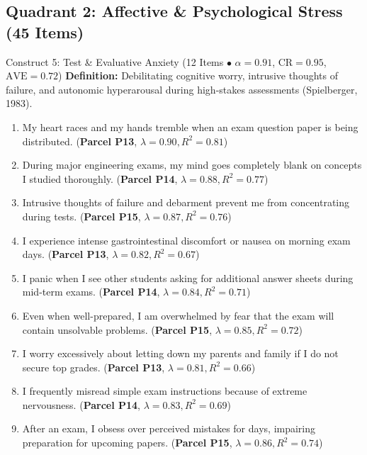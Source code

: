 \documentclass[10pt,a4paper]{article}
\begin{document}
\subsection{Quadrant 2: Affective \& Psychological Stress (45 Items)}

\begin{constructbox}{Construct 5: Test \& Evaluative Anxiety (12 Items $\bullet$ $\alpha = 0.91$, $\text{CR} = 0.95$, $\text{AVE} = 0.72$)}
\textbf{Definition:} Debilitating cognitive worry, intrusive thoughts of failure, and autonomic hyperarousal during high-stakes assessments (Spielberger, 1983).
\begin{enumerate}[label=\textbf{Q\arabic*.}, leftmargin=2.5em, itemsep=2pt, resume]
  \item My heart races and my hands tremble when an exam question paper is being distributed. \hfill (\textbf{Parcel P13}, $\lambda = 0.90, R^2 = 0.81$)
  \item During major engineering exams, my mind goes completely blank on concepts I studied thoroughly. \hfill (\textbf{Parcel P14}, $\lambda = 0.88, R^2 = 0.77$)
  \item Intrusive thoughts of failure and debarment prevent me from concentrating during tests. \hfill (\textbf{Parcel P15}, $\lambda = 0.87, R^2 = 0.76$)
  \item I experience intense gastrointestinal discomfort or nausea on morning exam days. \hfill (\textbf{Parcel P13}, $\lambda = 0.82, R^2 = 0.67$)
  \item I panic when I see other students asking for additional answer sheets during mid-term exams. \hfill (\textbf{Parcel P14}, $\lambda = 0.84, R^2 = 0.71$)
  \item Even when well-prepared, I am overwhelmed by fear that the exam will contain unsolvable problems. \hfill (\textbf{Parcel P15}, $\lambda = 0.85, R^2 = 0.72$)
  \item I worry excessively about letting down my parents and family if I do not secure top grades. \hfill (\textbf{Parcel P13}, $\lambda = 0.81, R^2 = 0.66$)
  \item I frequently misread simple exam instructions because of extreme nervousness. \hfill (\textbf{Parcel P14}, $\lambda = 0.83, R^2 = 0.69$)
  \item After an exam, I obsess over perceived mistakes for days, impairing preparation for upcoming papers. \hfill (\textbf{Parcel P15}, $\lambda = 0.86, R^2 = 0.74$)

\end{enumerate}
\end{constructbox}
\end{document}
